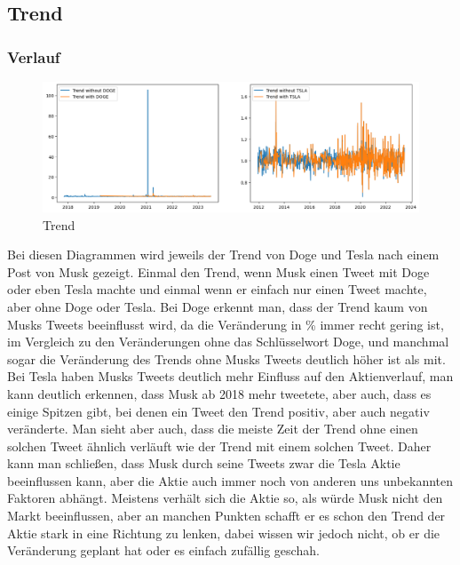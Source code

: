\documentclass{article}
\begin{document}
\newpage



\subsection{Trend}
\subsubsection{Verlauf}
\begin{figure}[!htb]
  	\includegraphics[width=\textwidth, center]{./imgs/Trend.png}
 	\caption{Trend}
 	\label{fig:Trend}
\end{figure}
Bei diesen Diagrammen wird jeweils der Trend von Doge und Tesla nach einem Post von Musk gezeigt. Einmal den Trend, wenn Musk einen Tweet mit Doge oder eben Tesla machte und einmal wenn er einfach nur einen Tweet machte, aber ohne Doge oder Tesla. Bei Doge erkennt man, dass der Trend kaum von Musks Tweets beeinflusst wird, da die Veränderung in \% immer recht gering ist, im Vergleich zu den Veränderungen ohne das
Schlüsselwort Doge, und manchmal sogar die Veränderung des Trends ohne Musks Tweets deutlich höher ist als mit. Bei Tesla haben Musks Tweets deutlich mehr Einfluss auf den Aktienverlauf, man kann deutlich erkennen, dass Musk ab 2018 mehr tweetete, aber auch, dass es einige Spitzen gibt, bei denen ein Tweet den Trend positiv, aber auch negativ veränderte. Man sieht aber auch, dass die meiste Zeit der Trend ohne einen solchen Tweet ähnlich verläuft wie der Trend mit einem solchen Tweet. Daher kann man schließen, dass Musk durch seine Tweets zwar die Tesla Aktie beeinflussen kann, aber die Aktie auch immer noch von anderen uns unbekannten Faktoren abhängt. Meistens verhält sich die Aktie so, als würde Musk nicht den Markt beeinflussen, aber an manchen Punkten schafft er es schon den Trend der Aktie stark in eine Richtung zu lenken, dabei wissen wir jedoch nicht, ob er die Veränderung geplant hat oder es einfach zufällig geschah.
\end{document}
